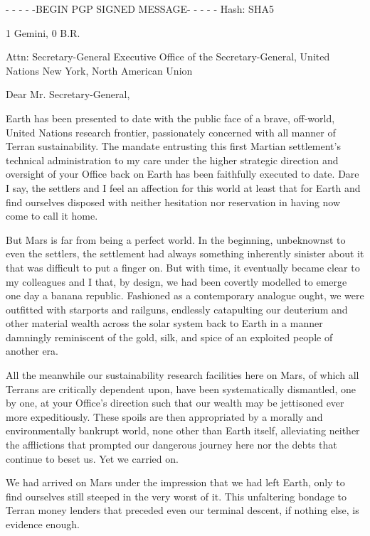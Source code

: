 
\startlines
- - - - -BEGIN PGP SIGNED MESSAGE- - - - -
Hash: SHA5

1 Gemini, 0 B.R.

Attn: Secretary-General
Executive Office of the Secretary-General, United Nations
New York, North American Union
\blank

Dear Mr. Secretary-General,

Earth has been presented to date with the public face of a brave, off-world, United Nations research frontier, passionately concerned with all manner of Terran sustainability. The mandate entrusting this first Martian settlement's technical administration to my care under the higher strategic direction and oversight of your Office back on Earth has been faithfully executed to date. Dare I say, the settlers and I feel an affection for this world at least that for Earth and find ourselves disposed with neither hesitation nor reservation in having now come to call it home.

But Mars is far from being a perfect world. In the beginning, unbeknownst to even the settlers, the settlement had always something inherently sinister about it that was difficult to put a finger on. But with time, it eventually became clear to my colleagues and I that, by design, we had been covertly modelled to emerge one day a banana republic. Fashioned as a contemporary analogue ought, we were outfitted with starports and railguns, endlessly catapulting our deuterium and other material wealth across the solar system back to Earth in a manner damningly reminiscent of the gold, silk, and spice of an exploited people of another era.

All the meanwhile our sustainability research facilities here on Mars, of which all Terrans are critically dependent upon, have been systematically dismantled, one by one, at your Office's direction such that our wealth may be jettisoned ever more expeditiously. These spoils are then appropriated by a morally and environmentally bankrupt world, none other than Earth itself, alleviating neither the afflictions that prompted our dangerous journey here nor the debts that continue to beset us. Yet we carried on.

We had arrived on Mars under the impression that we had left Earth, only to find ourselves still steeped in the very worst of it. This unfaltering bondage to Terran money lenders that preceded even our terminal descent, if nothing else, is evidence enough.

